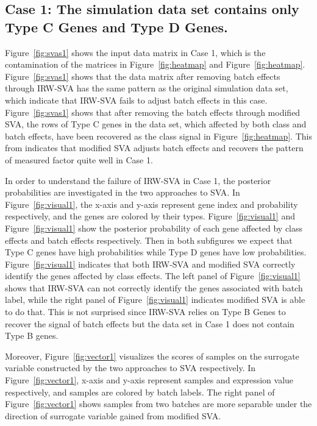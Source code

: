 \documentclass[11pt]{article}
\begin{document}
\subsection{Case 1: The simulation data set contains only Type C Genes and Type D Genes.}

Figure~\ref{fig:svas1} shows the input data matrix in Case 1, which is the contamination of the matrices in Figure~\ref{fig:heatmap} and Figure~\ref{fig:heatmap}. Figure~\ref{fig:svas1} shows that the data matrix after removing batch effects through IRW-SVA has the same pattern as the original simulation data set, which indicate that IRW-SVA fails to adjust batch effects in this case. Figure~\ref{fig:svas1} shows that after removing the batch effects through modified SVA, the rows of Type C genes in the data set, which affected by both class and batch effects, have been recovered as the class signal in Figure~\ref{fig:heatmap}. This from indicates that modified SVA adjusts batch effects and recovers the pattern of measured factor quite well in Case 1. 

In order to understand the failure of IRW-SVA in Case 1, the posterior probabilities are investigated in the two approaches to SVA. In Figure~\ref{fig:visual1}, the x-axis and y-axis represent gene index and probability respectively, and the genes are colored by their types. Figure~\ref{fig:visual1} and Figure~\ref{fig:visual1} show the posterior probability of each gene affected by class effects and batch effects respectively. Then in both subfigures we expect that Type C genes have high probabilities while Type D genes have low probabilities. Figure~\ref{fig:visual1} indicates that both IRW-SVA and modified SVA correctly identify the genes affected by class effects. The left panel of Figure~\ref{fig:visual1} shows that IRW-SVA can not correctly identify the genes associated with batch label, while the right panel of Figure~\ref{fig:visual1} indicates modified SVA is able to do that. This is not surprised since IRW-SVA relies on Type B Genes to recover the signal of batch effects but the data set in Case 1 does not contain Type B genes.

Moreover, Figure~\ref{fig:vector1} visualizes the scores of samples on the surrogate variable constructed by the two approaches to SVA respectively. In Figure~\ref{fig:vector1}, x-axis and y-axis represent samples and expression value respectively, and samples are colored by batch labels. The right panel of Figure~\ref{fig:vector1} shows samples from two batches are more separable under the direction of surrogate variable gained from modified SVA. 
\end{document}
